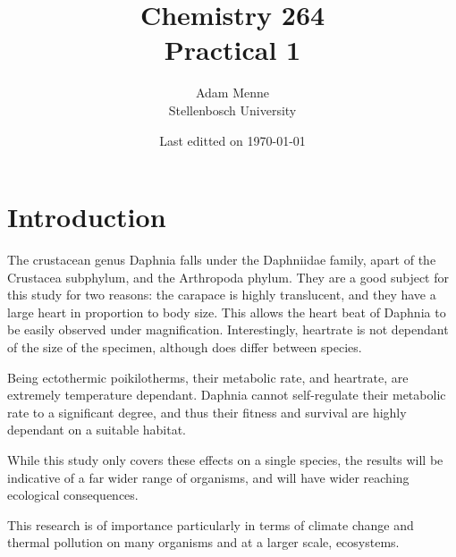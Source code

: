 \documentclass[a4paper, british]{article}
\title{Chemistry 264\\ Practical 1}
\date{Last editted on \today}
\author{Adam Menne\\ Stellenbosch University}
\begin{document}
\maketitle



\section{Introduction}

The crustacean genus Daphnia falls under the Daphniidae family, apart of the Crustacea subphylum, and the Arthropoda phylum. They are a good subject for this study for two reasons: the carapace is highly translucent, and they have a large heart in proportion to body size. This allows the heart beat of Daphnia to be easily observed under magnification. Interestingly, heartrate is not dependant of the size of the specimen, although does differ between species.\cite{santosoCardiovascularPerformanceMeasurement2020}

Being ectothermic poikilotherms, their metabolic rate, and heartrate, are extremely temperature dependant. Daphnia cannot self-regulate their metabolic rate to a significant degree, and thus their fitness and survival are highly dependant on a suitable habitat.
\begin{figure}[htb]
    \centering
\end{figure}


\newpage

While this study only covers these effects on a single species, the results will be indicative of a far wider range of organisms, and will have wider reaching ecological consequences.

This research is of importance particularly in terms of climate change and thermal pollution on many organisms and at a larger scale, ecosystems.
\end{document}
